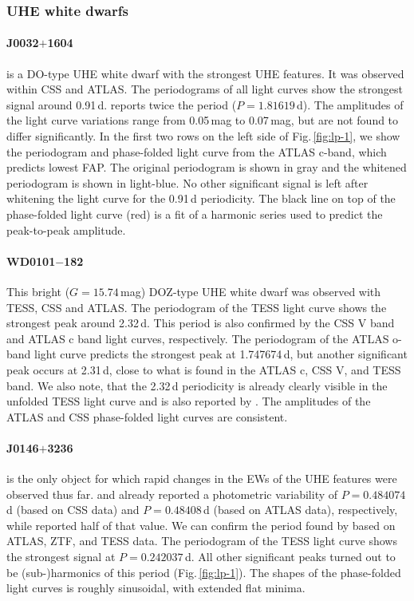 \documentclass{aa}
\newcommand{\fg}[1]{\mbox{Fig.\,\ref{#1}}}
\begin{document}
\subsubsection{UHE white dwarfs}
\label{sect:uhenotes}
 
\paragraph{J0032$+$1604} is a DO-type UHE white dwarf with the strongest
UHE features. It was observed within CSS and ATLAS. The periodograms
of all light curves show the strongest signal around 0.91\,d.
\cite{Heinze+2018} reports twice the period ($P=1.81619$\,d).
The amplitudes of the light curve variations range from 0.05\,mag
to 0.07\,mag, but are not found to differ significantly. In the first two rows
on the left side of \fg{fig:lp-1}, we show the periodogram and phase-folded light
curve from the ATLAS c-band, which predicts lowest FAP. The original
periodogram is shown in gray and the whitened periodogram is shown in
light-blue. No other significant signal is left after whitening the light curve
for the 0.91\,d periodicity. The black line on top of the phase-folded
light curve (red) is a fit of a harmonic series used to predict the
peak-to-peak amplitude.
\paragraph{WD0101$-$182} This bright ($G=15.74$\,mag) DOZ-type UHE white dwarf
was observed with TESS, CSS and ATLAS. The periodogram of
the TESS light curve shows the strongest peak around 2.32\,d. This period
is also confirmed by the CSS V band and ATLAS c band light curves,
respectively. The periodogram of the ATLAS o-band light curve predicts
the strongest peak at 1.747674\,d, but another significant
peak occurs at 2.31\,d, close to what is found in the
ATLAS c, CSS V, and TESS band. We also note, that the 2.32\,d periodicity
is already clearly visible in the unfolded TESS light curve and is also reported by
\cite{Heinze+2018}. The amplitudes of the ATLAS and CSS phase-folded light
curves are consistent.
\paragraph{J0146$+$3236} is the only object for which
rapid changes in the EWs of the UHE features were observed thus far.
\cite{Drake+2014} and \cite{Heinze+2018} already reported a photometric variability
of $P=0.484074$\,d (based on CSS data) and $P=0.48408$\,d (based
on ATLAS data), respectively, while \cite{Reindl+2019} reported half of that value.
We can confirm the period found by \cite{Reindl+2019}
based on ATLAS, ZTF, and TESS data. The periodogram of the
TESS light curve shows the strongest signal at $P=0.242037$\,d.
All other significant peaks turned out to be
(sub-)harmonics of this period (\fg{fig:lp-1}). The shapes of the phase-folded light curves
is roughly sinusoidal, with extended flat minima.
\end{document}
